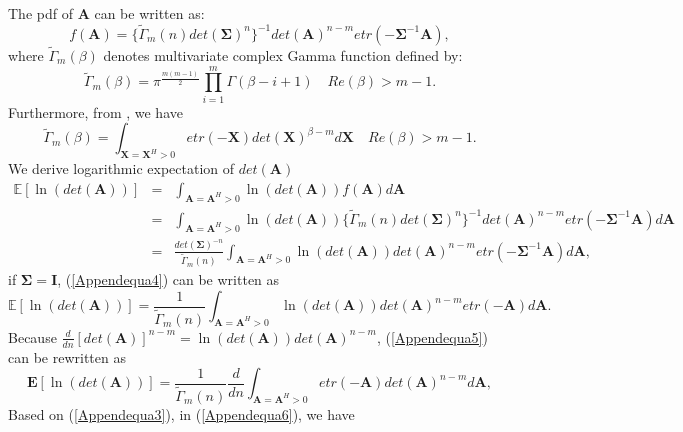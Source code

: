 \documentclass[12pt, draftclsnofoot, onecolumn]{IEEEtran}
\begin{document}
The pdf of $\mathbf{A}$ can be written as\cite{nagar2011expectations}:
\begin{equation}
f(\mathbf{A})=\{\tilde{\Gamma}_{m}(n)det(\mathbf{\Sigma})^{n} \}^{-1}det(\mathbf{A})^{n-m}etr(-\mathbf{\Sigma}^{-1}\mathbf{A}),
\label{Appendequa1}
\end{equation}
where $\tilde{\Gamma}_{m}(\beta)$ denotes multivariate complex Gamma function defined by\cite{nagar2011expectations}:
\begin{equation}
\tilde{\Gamma}_{m}(\beta)=\pi^{\frac{m(m-1)}{2}}\prod_{i=1}^{m}\Gamma(\beta-i+1)\quad Re(\beta)>m-1.
\label{Appendequa2}
\end{equation}
Furthermore, from \cite{nagar2011expectations}, we have 
\begin{equation}
\tilde{\Gamma}_{m}(\beta)=\int_{\mathbf{X}=\mathbf{X}^{H}>0}etr(-\mathbf{X})det(\mathbf{X})^{\beta-m}d
\mathbf{X} \quad Re(\beta)>m-1.
\label{Appendequa3}
\end{equation}
We derive logarithmic expectation of $det(\mathbf{A})$
\begin{eqnarray}
\nonumber
\mathbb{E}[\ln(det(\mathbf{A}))]&=&\int_{\mathbf{A}=\mathbf{A}^{H}>0}\ln(det(\mathbf{A}))f(\mathbf{A})d\mathbf{A}\\
\nonumber
&=&\int_{\mathbf{A}=\mathbf{A}^{H}>0}\ln(det(\mathbf{A}))\{\tilde{\Gamma}_{m}(n)det(\mathbf{\Sigma})^{n} \}^{-1}det(\mathbf{A})^{n-m}etr(-\mathbf{\Sigma}^{-1}\mathbf{A})d\mathbf{A}\\
&=&\frac{det(\mathbf{\Sigma})^{-n}}{\tilde{\Gamma}_{m}(n)}\int_{\mathbf{A}=\mathbf{A}^{H}>0}\ln(det(\mathbf{A}))det(\mathbf{A})^{n-m}etr(-\mathbf{\Sigma}^{-1}\mathbf{A})d\mathbf{A},
\label{Appendequa4}
\end{eqnarray}
if $\mathbf{\Sigma}=\mathbf{I}$, (\ref{Appendequa4}) can be written as 
\begin{equation}
\mathbb{E}[\ln(det(\mathbf{A}))]=\frac{1}{\tilde{\Gamma}_{m}(n)}\int_{\mathbf{A}=\mathbf{A}^{H}>0}\ln(det(\mathbf{A}))det(\mathbf{A})^{n-m}etr(-\mathbf{A})d\mathbf{A}.
\label{Appendequa5}
\end{equation}
Because $\frac{d}{dn}[det(\mathbf{A})]^{n-m}=\ln(det(\mathbf{A}))det(\mathbf{A})^{n-m}$, (\ref{Appendequa5}) can be rewritten as
\begin{equation}
\mathbf{E}[\ln(det(\mathbf{A}))]=\frac{1}{\tilde{\Gamma}_{m}(n)}\frac{d}{dn}\int_{\mathbf{A}=\mathbf{A}^{H}>0}etr(-\mathbf{A})det(\mathbf{A})^{n-m}d\mathbf{A},
\label{Appendequa6}
\end{equation}
Based on (\ref{Appendequa3}), in (\ref{Appendequa6}), we have  
\end{document}
